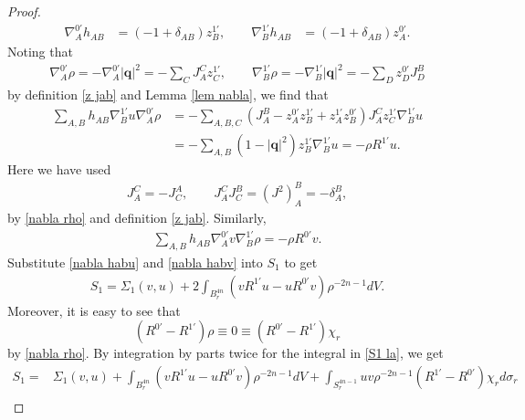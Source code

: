 \documentclass[a4paper,11pt]{amsart}
\numberwithin{equation}{section}
\begin{document}
\begin{proof}
\begin{equation}
\begin{aligned}
\nabla_{A}^{0'}h_{AB}&=(-1+\delta_{AB})z_{B}^{1'},\qquad \nabla_{B}^{1'}h_{AB}&=(-1+\delta_{AB})z_{A}^{0'}.
\end{aligned}\end{equation}
Noting that
\begin{equation}\begin{aligned}\label{nabla rho}
\nabla_{A}^{0'}\rho=-\nabla_{A}^{0'}|\mathbf{q}|^2=-\sum_{C}J_A^Cz_C^{1'},\qquad \nabla_{B}^{1'}\rho=-\nabla_{B}^{1'}|\mathbf{q}|^2=-\sum_{D}z_D^{0'}J_D^B
\end{aligned}\end{equation}
by definition \eqref{z jab} and Lemma \ref{lem nabla}, we find that
\begin{equation}\begin{aligned}\label{nabla habu}
\sum_{A,B}h_{AB}\nabla_{B}^{1'}u\nabla_{A}^{0'} \rho&=-\sum_{A,B,C}(J_A^B-z_{A}^{0'}z_{B}^{1'}+z_{A}^{1'}z_{B}^{0'})J_A^Cz_C^{1'}\nabla_{B}^{1'}u\\
&=-\sum_{A,B}(1-|\mathbf{q}|^2)z_{B}^{1'}\nabla_{B}^{1'}u=-\rho R^{1'}u.
\end{aligned}\end{equation}
Here we have used
\begin{equation}\begin{aligned}\label{5.13}
J_A^C=-J_C^A,\qquad J_A^CJ_C^B=\left(J^2\right)_A^B=-\delta_A^B,
\end{aligned}\end{equation}
by \eqref{nabla rho} and definition \eqref{z jab}. Similarly,
\begin{equation}\begin{aligned}\label{nabla habv}
\sum_{A,B}h_{AB}\nabla_{A}^{0'}v\nabla_{B}^{1'} \rho=-\rho R^{0'}v.
\end{aligned}\end{equation}
Substitute \eqref{nabla habu} and \eqref{nabla habv} into $S_1$ to get
\begin{equation}\begin{aligned}\label{S1 la}
S_1=\Sigma_1(v,u)+2\int_{B^{4n}_r}(v R^{1'}u-u R^{0'}v)\rho^{-2n-1}dV.
\end{aligned}\end{equation}
Moreover, it is easy to see that $$(R^{0'}-R^{1'})\rho\equiv 0\equiv(R^{0'}-R^{1'})\chi_r$$ by \eqref{nabla rho}. By integration by parts twice for the integral in \eqref{S1 la}, we get
\begin{equation*}\begin{aligned}
S_1=&\Sigma_1(v,u)+\int_{B^{4n}_r}(v R^{1'}u-u R^{0'}v)\rho^{-2n-1}dV+\int_{S^{4n-1}_r}uv\rho^{-2n-1}(R^{1'}-R^{0'})\chi_r d\sigma_r\\

\end{aligned}
\end{equation*}
\end{proof}
\end{document}

